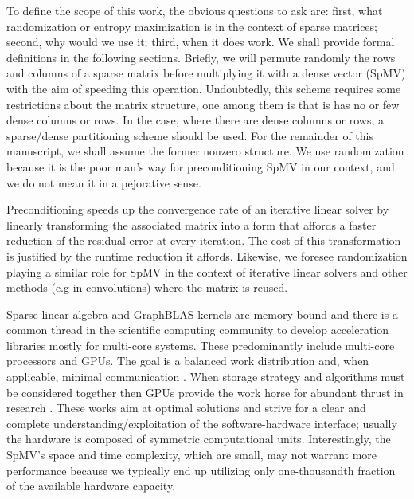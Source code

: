 \documentclass[acmsmall]{acmart}
\begin{document}
To define the scope of this work, the obvious questions to ask are:
first, what randomization or entropy maximization is in the context of
sparse matrices; second, why would we use it; third, when it does
work.  We shall provide formal definitions in the following
sections. Briefly, we will permute randomly the rows and columns of a
sparse matrix before multiplying it with a dense vector (SpMV) with
the aim of speeding this operation.  Undoubtedly, this scheme requires
some restrictions about the matrix structure, one among them is that
is has no or few dense columns or rows.  In the case, where there are
dense columns or rows, a sparse/dense partitioning scheme should be
used. For the remainder of this manuscript, we shall assume the former
nonzero structure. We use randomization because it is the poor man's
way for preconditioning SpMV in our context, and we do not mean it in
a pejorative sense.


Preconditioning speeds up the convergence rate of an iterative linear
solver by linearly transforming the associated matrix into a form that
affords a faster reduction of the residual error at every iteration.
The cost of this transformation is justified by the runtime reduction
it affords.  Likewise, we foresee randomization playing a similar role
for SpMV in the context of iterative linear solvers and other methods
(e.g in convolutions) where the matrix is reused.

Sparse linear algebra and GraphBLAS kernels are memory bound and there
is a common thread in the scientific computing community to develop
acceleration libraries mostly for multi-core systems. These
predominantly include multi-core processors and GPUs. The goal is
a balanced work distribution and, when applicable, minimal
communication
\cite{DBLP:journals/siamsc/KayaaslanAU18,DBLP:conf/ieeehpcs/PageK18}. When
storage strategy and algorithms must be considered together then GPUs
provide the work horse for abundant thrust in research
\cite{DBLP:journals/topc/AnztCYDFNTTW20}. These works aim at optimal
solutions and strive for a clear and complete
understanding/exploitation of the software-hardware interface; usually
the hardware is composed of symmetric computational
units. Interestingly, the SpMV's space and time complexity, which are
small, may not warrant more performance because we typically end up
utilizing only one-thousandth fraction of the available hardware
capacity.
\end{document}
